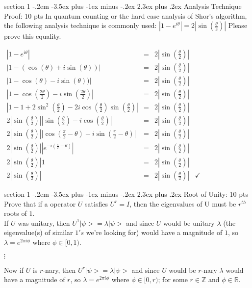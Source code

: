 \documentclass[12pt]{article}
\makeatletter
\newcommand{\<}{\langle}
\renewcommand{\>}{\rangle}
\newenvironment{problem}{\@startsection
       {section}
       {1}
       {-.2em}
       {-3.5ex plus -1ex minus -.2ex}
       {2.3ex plus .2ex}
       {\pagebreak[3]
       \large\bf\noindent{Problem }
       }
       }
       {%
       \begin{center}\large\bf \end{center}}
\def\ZZ{\mathbb{Z}}
\def\RR{\mathbb{R}}
\def\ket#1{\big|{#1}\big>}
\makeatother
\begin{document}
\begin{problem}{Analysis Technique Proof: 10 pts}
In quantum counting or the hard case analysis of Shor’s algorithm, the following
analysis technique is commonly used: $\left| 1 - e^{i\theta} \right| = 2\left| \sin (\frac{\theta}{2})\right|$ Please prove this equality.\\
\begin{center}
$\begin{array}{cccc}
\left| 1 - e^{i\theta} \right| &=& 2\left| \sin (\frac{\theta}{2})\right|\\
\left| 1 - (\cos (\theta) + i\sin (\theta)) \right| &=& 2\left| \sin (\frac{\theta}{2})\right|\\
\left| 1 - \cos (\theta) - i\sin (\theta)) \right| &=& 2\left| \sin (\frac{\theta}{2})\right|\\
\left| 1 - \cos \left( \frac{2\theta}{2} \right) - i\sin \left(\frac{2\theta}{2} \right) \right| &=& 2\left| \sin (\frac{\theta}{2})\right|\\
\left| 1 - 1 + 2\sin^2 \left( \frac{\theta}{2} \right) - 2i\cos \left(\frac{\theta}{2} \right)\sin \left(\frac{\theta}{2}\right) \right| &=& 2\left| \sin (\frac{\theta}{2})\right|\\
2 \left|\sin \left( \frac{\theta}{2} \right) \right| \left| \sin \left( \frac{\theta}{2} \right) - i\cos \left( \frac{\theta}{2} \right) \right| &=& 2\left| \sin (\frac{\theta}{2})\right|\\
2 \left|\sin \left( \frac{\theta}{2} \right) \right| \left| \cos \left( \frac{\pi}{2} - \theta \right) - i\sin \left( \frac{\pi}{2} - \theta \right) \right| &=& 2\left| \sin (\frac{\theta}{2})\right|\\
2 \left|\sin \left( \frac{\theta}{2} \right) \right| \left| e^{-i\left( \frac{\pi}{2} - \theta\right)} \right| &=& 2\left| \sin (\frac{\theta}{2})\right|\\
2 \left|\sin \left( \frac{\theta}{2} \right) \right| 1 &=& 2\left| \sin (\frac{\theta}{2})\right|\\
2 \left|\sin \left( \frac{\theta}{2} \right) \right| &=& 2\left| \sin (\frac{\theta}{2})\right|&\checkmark
\end{array}$
\end{center}
\end{problem}

\begin{problem}{Root of Unity: 10 pts}
Prove that if a operator $U$ satisfies $U^r = I$, then the eigenvalues of U must be $r^{th}$ roots of $1$.\\
If $U$ was unitary, then $U^1\ket{\psi} = \lambda\ket{\psi}$ and since $U$ would be unitary $\lambda$ (the eigenvalue(s) of similar $1's$ we're looking for) would have a magnitude of $1$, so $\lambda = e^{2\pi i\phi}$ where $\phi \in [0,1)$.\\
\begin{center}
$\vdots$
\end{center}
Now if $U$ is $r$-nary, then $U^r\ket{\psi} = \lambda\ket{\psi}$ and since $U$ would be $r$-nary $\lambda$  would have a magnitude of $r$, so $\lambda = e^{2\pi i\phi}$ where $\phi \in [0,r)$; for some $r\in\ZZ$ and $\phi\in\RR$.\\
\end{problem}
\newpage
\end{document}
